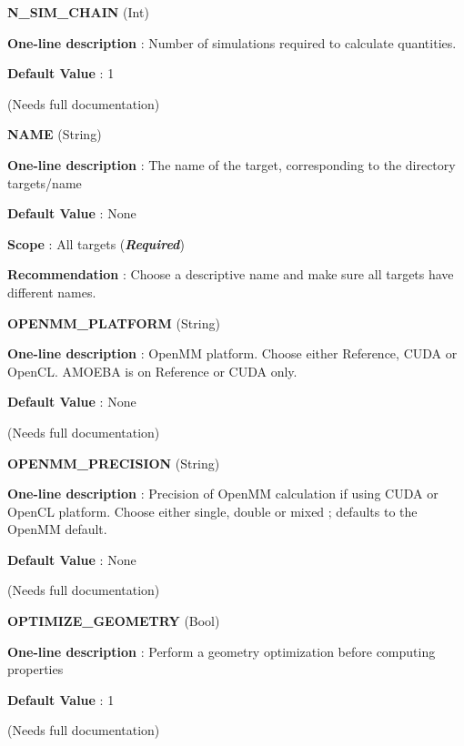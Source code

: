\begin{DoxyItemize}
\item {\bfseries  N\-\_\-\-S\-I\-M\-\_\-\-C\-H\-A\-I\-N } (Int) \par
{\bfseries  One-\/line description }\-: Number of simulations required to calculate quantities. \par
{\bfseries  Default Value }\-: 1 \par
(Needs full documentation)\end{DoxyItemize}
\begin{DoxyItemize}
\item {\bfseries  N\-A\-M\-E } (String) \par
{\bfseries  One-\/line description }\-: The name of the target, corresponding to the directory targets/name \par
{\bfseries  Default Value }\-: None \par
{\bfseries  Scope }\-: All targets ({\bfseries {\itshape Required}}) \par
{\bfseries  Recommendation }\-: Choose a descriptive name and make sure all targets have different names.\end{DoxyItemize}
\begin{DoxyItemize}
\item {\bfseries  O\-P\-E\-N\-M\-M\-\_\-\-P\-L\-A\-T\-F\-O\-R\-M } (String) \par
{\bfseries  One-\/line description }\-: Open\-M\-M platform. Choose either Reference, C\-U\-D\-A or Open\-C\-L. A\-M\-O\-E\-B\-A is on Reference or C\-U\-D\-A only. \par
{\bfseries  Default Value }\-: None \par
(Needs full documentation)\end{DoxyItemize}
\begin{DoxyItemize}
\item {\bfseries  O\-P\-E\-N\-M\-M\-\_\-\-P\-R\-E\-C\-I\-S\-I\-O\-N } (String) \par
{\bfseries  One-\/line description }\-: Precision of Open\-M\-M calculation if using C\-U\-D\-A or Open\-C\-L platform. Choose either single, double or mixed ; defaults to the Open\-M\-M default. \par
{\bfseries  Default Value }\-: None \par
(Needs full documentation)\end{DoxyItemize}
\begin{DoxyItemize}
\item {\bfseries  O\-P\-T\-I\-M\-I\-Z\-E\-\_\-\-G\-E\-O\-M\-E\-T\-R\-Y } (Bool) \par
{\bfseries  One-\/line description }\-: Perform a geometry optimization before computing properties \par
{\bfseries  Default Value }\-: 1 \par
(Needs full documentation)\end{DoxyItemize}
